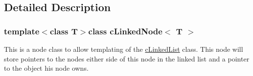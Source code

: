 \subsection{Detailed Description}
\subsubsection*{template$<$class T$>$class cLinkedNode$<$ T $>$}

This is a node class to allow templating of the \hyperlink{classc_linked_list}{cLinkedList} class. This node will store pointers to the nodes either side of this node in the linked list and a pointer to the object his node owns. 